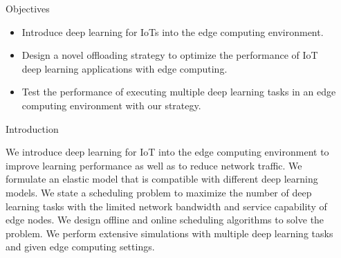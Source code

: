 \documentclass[final]{beamer}
\newlength{\sepwid}
\newlength{\onecolwid}
\begin{document}
\begin{frame}

\begin{columns}[t] %

\begin{column}{\sepwid}\end{column} %

\begin{column}{\onecolwid} %


\begin{exampleblock}{Objectives}

\begin{itemize}
\item Introduce deep learning for IoTs into the edge computing environment.
\item Design a novel offloading strategy to optimize the performance of IoT deep learning applications with edge computing.
\item Test the performance of executing multiple deep learning tasks in an edge computing environment with our strategy.  
\end{itemize}

\end{exampleblock}


\begin{exampleblock}{Introduction}

We introduce deep learning for IoT into the edge computing environment to improve learning performance as well as to reduce network traffic. We formulate an elastic model that is compatible with different deep learning models. We state a scheduling problem to maximize the number of deep learning tasks with the limited network bandwidth and service capability of edge nodes. We design offline and online scheduling algorithms to solve the problem. We perform extensive simulations with multiple deep learning tasks and given edge computing settings.


\end{exampleblock}
\end{column}
\end{columns}
\end{frame}
\end{document}
